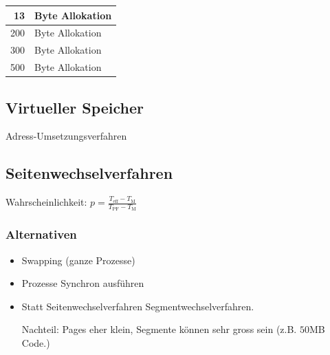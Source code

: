 \begin{tabular}{ | r | l |}
\hline
13 & Byte Allokation \\
\hline
200 & Byte Allokation \\
\hline
300 & Byte Allokation \\
\hline
500 & Byte Allokation \\
\hline
\end{tabular}

\subsection{Virtueller Speicher}

Adress-Umsetzungsverfahren

\subsection{Seitenwechselverfahren}

Wahrscheinlichkeit: $p=\frac{T_\text{eff}-T_\text{M}}{T_\text{PF}-T_\text{M}}$

\subsubsection{Alternativen}

\begin{itemize}
\item Swapping (ganze Prozesse)
\item Prozesse Synchron ausführen
\item Statt Seitenwechselverfahren Segmentwechselverfahren.

	Nachteil: Pages eher klein, Segmente können sehr gross sein (z.B. $50$MB Code.)
\end{itemize}


